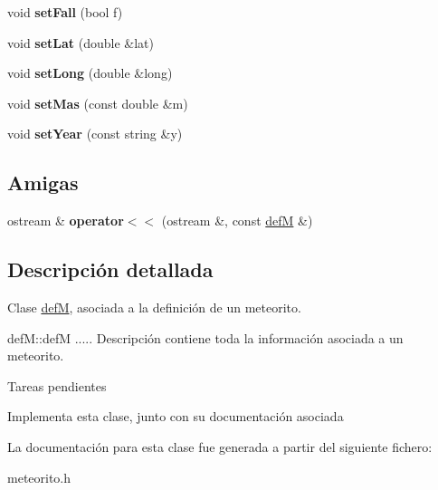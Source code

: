 \begin{DoxyCompactItemize}
\item 
\hypertarget{classdefM_aac6d0ed22884bcf80232e0762b1e5a76}{void {\bfseries set\-Fall} (bool f)}\label{classdefM_aac6d0ed22884bcf80232e0762b1e5a76}

\item 
\hypertarget{classdefM_ab5be7f761750d3e309015ac78eaef8b9}{void {\bfseries set\-Lat} (double \&lat)}\label{classdefM_ab5be7f761750d3e309015ac78eaef8b9}

\item 
\hypertarget{classdefM_a496ad490b7b34f63146178a282a7c102}{void {\bfseries set\-Long} (double \&long)}\label{classdefM_a496ad490b7b34f63146178a282a7c102}

\item 
\hypertarget{classdefM_ae0aae6cbc83073b714403fd2532f29e7}{void {\bfseries set\-Mas} (const double \&m)}\label{classdefM_ae0aae6cbc83073b714403fd2532f29e7}

\item 
\hypertarget{classdefM_a1fb9d0be4b62c10d7296851d5393fe34}{void {\bfseries set\-Year} (const string \&y)}\label{classdefM_a1fb9d0be4b62c10d7296851d5393fe34}

\end{DoxyCompactItemize}
\subsection*{\-Amigas}
\begin{DoxyCompactItemize}
\item 
\hypertarget{classdefM_a3784f8dcda03b04a658b79b87c603945}{ostream \& {\bfseries operator$<$$<$} (ostream \&, const \hyperlink{classdefM}{def\-M} \&)}\label{classdefM_a3784f8dcda03b04a658b79b87c603945}

\end{DoxyCompactItemize}


\subsection{\-Descripción detallada}
\-Clase \hyperlink{classdefM}{def\-M}, asociada a la definición de un meteorito. 

def\-M\-::def\-M ..... \-Descripción contiene toda la información asociada a un meteorito.

\begin{DoxyRefDesc}{\-Tareas pendientes}
\item[\hyperlink{todo__todo000012}{\-Tareas pendientes}]\-Implementa esta clase, junto con su documentación asociada\end{DoxyRefDesc}


\-La documentación para esta clase fue generada a partir del siguiente fichero\-:\begin{DoxyCompactItemize}
\item 
meteorito.\-h\end{DoxyCompactItemize}

